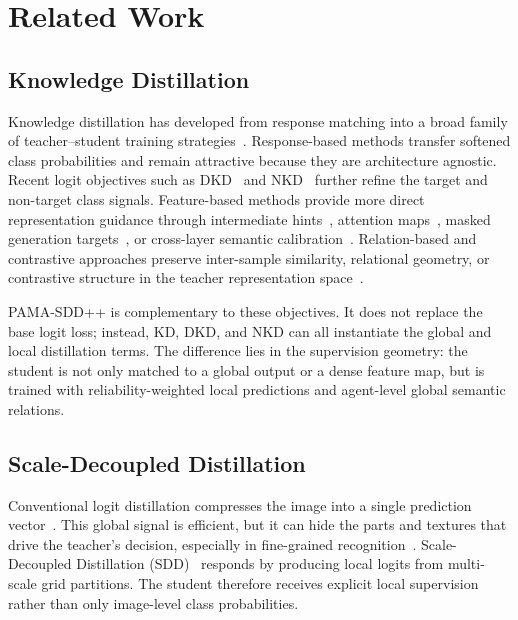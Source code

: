 \documentclass[a4paper,fleqn]{cas-dc}
\begin{document}
\section{Related Work}
\label{sec:related_work}

\subsection{Knowledge Distillation}
\label{subsec:kd}

Knowledge distillation has developed from response matching into a broad
family of teacher--student training strategies~\cite{hinton2015distilling,
gou2021knowledge,wang2020kdreview}. Response-based methods transfer softened
class probabilities and remain attractive because they are architecture
agnostic. Recent logit objectives such as DKD~\cite{zhao2022decoupled} and
NKD~\cite{yang2023knowledge} further refine the target and non-target class
signals. Feature-based methods provide more direct representation guidance
through intermediate hints~\cite{romero2015fitnets,chen2021distilling},
attention maps~\cite{zagoruyko2017paying}, masked generation
targets~\cite{yang2022masked}, or cross-layer semantic
calibration~\cite{chen2021semckd,mirzadeh2020teacher,xu2020selfsupervision}.
Relation-based and contrastive approaches preserve inter-sample similarity,
relational geometry, or contrastive structure in the teacher representation
space~\cite{tung2019similarity,park2019relational,tian2020contrastive}.

PAMA-SDD++ is complementary to these objectives. It does not replace the base
logit loss; instead, KD, DKD, and NKD can all instantiate the global and local
distillation terms. The difference lies in the supervision geometry: the
student is not only matched to a global output or a dense feature map, but is
trained with reliability-weighted local predictions and agent-level global
semantic relations.

\subsection{Scale-Decoupled Distillation}
\label{subsec:sdd}

Conventional logit distillation compresses the image into a single prediction
vector~\cite{hinton2015distilling,zhao2022decoupled,yang2023knowledge}. This
global signal is efficient, but it can hide the parts and textures that drive
the teacher's decision, especially in fine-grained
recognition~\cite{zhuang2020apinet,du2020pmg,he2022transfg}.
Scale-Decoupled Distillation (SDD)~\cite{wei2024scaled} responds by producing
local logits from multi-scale grid partitions. The student therefore receives
explicit local supervision rather than only image-level class probabilities.
\end{document}
